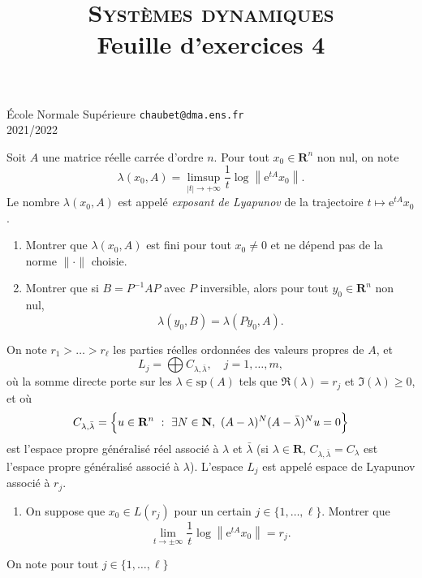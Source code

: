 \documentclass[a4paper,10pt,openany]{article}
\title{\textsc{Syst\`emes dynamiques} \\ Feuille d'exercices 4}
\date{}
\author{}
\theoremstyle{plain}
\theoremstyle{definition}
\newcommand{\e}{\mathrm{e}}
\newcommand{\R}{\mathbf{R}}
\newcommand{\N}{\mathbf{N}}
\begin{document}
{\noindent \'Ecole Normale Sup\'erieure  \hfill \texttt{chaubet@dma.ens.fr} } \\
{2021/2022 \hfill }

{\let\newpage\relax\maketitle}
\maketitle

 \vspace{1.5mm} 

\noindent Soit $A$ une matrice r\'eelle carr\'ee d'ordre $n$. Pour tout $x_0 \in \R^n$ non nul, on note
$$
\lambda(x_0, A) = \limsup_{|t| \to + \infty} \frac{1}{t} \log \left\|\e^{tA}x_0\right\|.
$$
Le nombre $\lambda(x_0,A)$ est appel\'e \textit{exposant de Lyapunov} de la trajectoire $\displaystyle{t \mapsto \e^{tA}x_0}$.
\begin{enumerate}
\item Montrer que $\lambda(x_0,A)$ est fini pour tout $x_0 \neq 0$ et ne d\'epend pas de la norme $\|\cdot\|$ choisie.
\item Montrer que si $B = P^{-1}AP$ avec $P$ inversible, alors pour tout $y_0 \in \R^n$ non nul,
$$
\lambda(y_0,B) = \lambda(Py_0,A).
$$
\end{enumerate}
On note $r_1 > \dots > r_\ell$ les parties r\'eelles ordonn\'ees des valeurs propres de $A$, et
$$
L_j = \bigoplus C_{\lambda, \bar{\lambda}}, \quad j=1,\dots,m,
$$
o\`u la somme directe porte sur les $\lambda \in \mathrm{sp}(A)$ tels que $\Re(\lambda) = r_j$ et $\Im(\lambda) \geq 0$, et o\`u 
$$C_{\lambda,\bar{\lambda}} = \Bigl\{u \in \R^n~:~ \exists N \in \N,~ (A-\lambda)^N(A-\bar{\lambda})^{N}u = 0 \Bigr\}$$
est l'espace propre g\'en\'eralis\'e r\'eel associ\'e \`a $\lambda$ et $\bar{\lambda}$ (si $\lambda \in \R$, $C_{\lambda, \bar{\lambda}} = C_\lambda$ est l'espace propre g\'en\'eralis\'e associ\'e \`a $\lambda$). L'espace $L_j$ est appel\'e espace de Lyapunov associ\'e \`a $r_j$.
\begin{enumerate}[resume]
\item On suppose que $x_0 \in L(r_j)$ pour un certain $j \in \{1, \dots, \ell\}$. Montrer que 
$$
\lim_{t\to \pm \infty} \frac{1}{t} \log \left\| \e^{tA}x_0 \right\| = r_j.
$$
\end{enumerate}
On note pour tout $j \in \{1, \dots, \ell\}$
\end{document}
